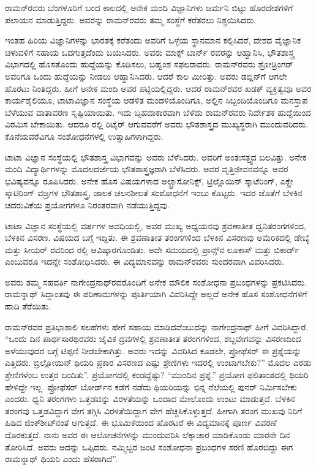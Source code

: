 ರಾಮನ್‍ರವರು ಬೆಂಗಳೂರಿಗೆ ಬಂದ ಕಾಲದಲ್ಲಿ ಅನೇಕ ಮಂದಿ ವಿಜ್ಞಾನಿಗಳು ಜರ್ಮನಿ ಬಿಟ್ಟು ಹೊರದೇಶಗಳಿಗೆ ಪಲಾಯನ ಮಾಡುತ್ತಿದ್ದರು. ಅವರನ್ನು ರಾಮನ್‍ರವರು ತಮ್ಮ ಸಂಸ್ಥೆಗೆ ಕರೆತರಲು ನಿಶ್ಚಯಿಸಿದರು.

ಇಂತಹ ಹಿರಿಯ ವಿಜ್ಞಾನಿಗಳನ್ನು ಭಾರತಕ್ಕೆ ಕರೆತಂದು ಅವರಿಗೆ ಒಳ್ಳೆಯ ಸ್ಥಾನಮಾನ ಕಲ್ಪಿಸಿದರೆ, ದೇಶದ ವೈಜ್ಞಾನಿಕ ಚಳುವಳಿಗೆ ಸಹಾಯ ಒದಗುತ್ತದೆಂದು ಬಯಸಿದರು. ಅವರು ಮಾಕ್ಸ್ ಬಾರ್ನ್ ರವರನ್ನು ಆಹ್ವಾನಿಸಿ, ಭೌತಶಾಸ್ತ್ರ ವಿಭಾಗದಲ್ಲಿ ಹೊಸತೊಂದು ಹುದ್ದೆಯನ್ನು ಕೊಡಿಸಲು, ಬಹ್ವಂಶ ಸಫಲರಾದರು. ರಾಮನ್‍ರವರು ಶ್ರೋಡ್ರಿಂಗರ್ ಅವರಿಗೂ ಒಂದು ಹುದ್ದೆಯನ್ನು ನೀಡಲು ಆಹ್ವಾನಿಸಿದರು. ಆದರೆ ಕಾಲ ಮೀರಿತ್ತು. ಅವರು ಡಬ್ಲಿನ್‍ಗೆ ಆಗಲೇ ಹೊರಟು ನಿಂತಿದ್ದರು. ಹೀಗೆ ಅನೇಕ ಮಂದಿ ಅವರ ಪಟ್ಟಿಯಲ್ಲಿದ್ದರು. ಆದರೆ ರಾಮನ್‍ರವರ ಖಡಕ್ ವ್ಯಕ್ತಿತ್ವವೂ ಅವರ ಕಾರ್ಯಶೈಲಿಯೂ, ಟಾಟಾವಿಜ್ಞಾನ ಸಂಸ್ಥೆಯ ಆಡಳಿತ ಮಂಡಳಿಯೊಂದಿಗೂ, ಅಲ್ಲಿನ ಸಿಬ್ಬಂದಿಯೊಂದಿಗೂ ಮನಸ್ತಾಪ ಬೆಳೆಯುವ ವಾತಾವರಣ ಸೃಷ್ಟಿಯಾಯಿತು. ಇದು ಬೃಹದಾಕಾರವಾಗಿ ಬೆಳೆದು ರಾಮನ್‍ರವರು ನಿರ್ದೇಶಕ ಹುದ್ದೆಯಿಂದ ವಿರಮಿಸ ಬೇಕಾಯಿತು. ಆದರೂ ರಲ್ಲಿ ರಿಟೈರ್ ಆಗುವವರೆಗೆ ಅವರು ಭೌತಶಾಸ್ತ್ರದ ಮುಖ್ಯಸ್ಥರಾಗಿ ಮುಂದುವರಿದರು. ಕೊನೆಯವರೆವಿಗೂ ಸಂಶೋಧನೆಗಳಲ್ಲಿ ಉತ್ಸಾಹಿಗಳಾಗಿದ್ದರು.

ಟಾಟಾ ವಿಜ್ಞಾನ ಸಂಸ್ಥೆಯಲ್ಲಿ ಭೌತಶಾಸ್ತ್ರ ವಿಭಾಗವನ್ನು ಅವರು ಬೆಳೆಸಿದರು. ಅವರಿಗೆ ಅಂತಃಸತ್ತ್ವದ ಬಲವಿತ್ತು. ಅನೇಕ ಮಂದಿ ವಿದ್ಯಾರ್ಥಿಗಳನ್ನು ಮೊದಲದರ್ಜೆಯ ಭೌತಶಾಸ್ತ್ರಜ್ಞರಾಗಿ ಬೆಳೆಸಿದರು. ಅವರ ವೃತ್ತಿಜೀವನವನ್ನೂ ಅವರ ಭವಿಷ್ಯವನ್ನೂ ರೂಪಿಸಿದರು. ಅನೇಕ ಹೊಸ ವಿಷಯಗಳಾದ ಅಲ್ಟ್ರಾಸೋನಿಕ್ಸ್, ಟ್ರಿಲ್ಲೊಯಿನ್ ಸ್ಕಾಟೆರಿಂಗ್, ಎಕ್ಸ್\enginline{-}ರೇ ಸ್ಕಾಟಿರಿಂಗ್ ವಜ್ರಗಳ ಭೌತಶಾಸ್ತ್ರ, ಜಾಲಕ ಚಲನಶೀಲತೆ ಸಂಶೋಧನೆಗೆ ಇಂಬು ಕೊಟ್ಟರು. ಇದರ ಜೊತೆಗೆ ಬೆಳಕಿನ ಚದರುವಿಕೆಯ ಪ್ರಯೋಗಗಳೂ ನಿರಂತರವಾಗಿ ನಡೆಯುತ್ತಿದ್ದವು.

ಟಾಟಾ ವಿಜ್ಞಾನ ಸಂಸ್ಥೆಯಲ್ಲಿ  ವರ್ಷಗಳ ಅವಧಿಯಲ್ಲಿ, ಅವರ ಮುಖ್ಯ ಅಧ್ಯಯನವು ಶ್ರವಣಾತೀತ ಧ್ವನಿತರಂಗಗಳಿಂದ, ಬೆಳಕಿನ ವಿಸರಣ. ವಿಷಯದ ಬಗ್ಗೆ ಇದ್ದಿತು. ಈ ಶ್ರವಣಾತೀತ ತರಂಗಗಳಿಂದ ಬೆಳಕಿನ ವಿಸರಣವು ಅಮೆರಿಕದಲ್ಲಿ ಡೇಬ್ಯೆ ಮತ್ತು ಸೀಯರ್ ರವರಿಂದ ರಲ್ಲಿ ಆವಿಷ್ಕಾರಗೊಂಡಿತು. ಅದೇ ಸಮಯದಲ್ಲಿ ಪ್ರಾನ್ಸ್‌ನ ಲೂಕಾಸ್ ಮತ್ತು ಬಿಕಾರ್ಡ್ ಎಂಬುವರೂ ಇದನ್ನೇ ಸಂಶೋಧಿಸಿದರು. ಈ ವಿದ್ಯಮಾನವನ್ನು ರಾಮನ್‍ರವರು ಸುಂದರವಾಗಿ ವಿವರಿಸಿದರು.

ಅವರು ತಮ್ಮ ಸಹವರ್ತಿ ನಾಗೇಂದ್ರನಾಥ್‍ರವರೊಂದಿಗೆ ಅನೇಕ ಮೌಲಿಕ ಸಂಶೋಧನಾ ಪ್ರಬಂಧಗಳನ್ನು ಪ್ರಕಟಿಸಿದರು. ರಾಮನ್\enginline{-}ನಾಥ್ ಸಿದ್ದಾಂತವು ಈ ಪರಿಣಾಮಗಳನ್ನು ಪೂರ್ತಿಯಾಗಿ ವಿವರಿಸಿದ್ದೇ ಅಲ್ಲದೆ ಅನೇಕ ಹೊಸ ಸಂಶೋಧನೆಗಳಿಗೆ ಹಾದಿ ತೆರೆಯಿತು.

ರಾಮನ್‍ರವರ ಪ್ರತಿಭಾಶಾಲಿ ಸಲಹೆಗಳು ಹೇಗೆ ಸಹಾಯ ಮಾಡಿದವೆಂಬುದನ್ನು ನಾಗೇಂದ್ರನಾಥ್ ಹೀಗೆ ವಿವರಿಸಿದ್ದಾರೆ. \enginline{-}“ಒಂದು ದಿನ ಪಾರ್ಥಸಾರಥಿರವರು ಜೈವಿಕ ದ್ರವಗಳಲ್ಲಿ ಶ್ರವಣಾತೀತ ತರಂಗಗಳಿಂದ, ಶಬ್ದವೇಗವನ್ನು ವಿಸರಣದಿಂದ ಅಳೆಯುವುದರ ಬಗ್ಗೆ ಟಿಪ್ಪಣಿ ನೀಡಬೇಕಾಗಿತ್ತು. ಅವರು ಇದನ್ನು ವಿವರಿಸಿದ ಕೂಡಲೇ, ಪ್ರೋಫೆಸರ್ ಈ ಪ್ರಶ್ನೆಯನ್ನು ಎತ್ತಿದರು. ಬ್ರಿಲ್ಲೋಯಿನ್ ಥಿಯರಿ ಪ್ರಕಾರ ವಿಸರಣದ ಎಷ್ಟು ಶ್ರೇಣಿಗಳು ಇದರಲ್ಲಿ ಉಂಟಾಗಬೇಕು?” ಮೊದಲ ಎರಡು ಶ್ರೇಣಿಗಳೆಂಬ ಉತ್ತರ ಬಂದಿತು”. ಪ್ರಯೋಗದಲ್ಲಿ ಕಂಡದ್ದೆಷ್ಟು? “ಮುಂದಿನ ಪ್ರಶ್ನೆ.” ಪ್ರಯೋಗ ಫಲಿತಾಂಶದಲ್ಲಿ ಥಿಯರಿ ಹೇಳಿದ್ದೇ ಇಲ್ಲ. ಪ್ರೋಫೆಸರ್ ಬೋರ್ಡ್‌ನ ಕಡೆಗೆ ನಡೆದು ಥಿಯರಿಯನ್ನು ಭಿನ್ನ ನೆಲೆಯಲ್ಲಿ ಪುನರ್ ನಿರ್ಮಿಸಬೇಕು ಎಂದರು. ಧ್ವನಿ ತರಂಗಗಳು ಒತ್ತಡವನ್ನು ವಿರಳತೆಯನ್ನು ಒಂದಾದ ಮೇಲೊಂದು ಉಂಟು ಮಾಡುತ್ತವೆ. ಬೆಳಕಿನ ತರಂಗವು ಒತ್ತಡವಿದ್ದಾಗ ವೇಗ ತಗ್ಗಿಸಿ ವಿರಳತೆಯಿದ್ದಾಗ ವೇಗ ಹೆಚ್ಚಿಸಿಕೊಳ್ಳುತ್ತದೆ. ಹೀಗಾಗಿ ತರಂಗ ಮುಖವು ನಿರಿಗೆ ಹಿಡಿದ ಜಿಂಕ್‍ಶೀಟ್‍ನಂತೆ ಆಗುತ್ತದೆ. ಈ ಭೂಮಿಕೆಯಿಂದ ಹೊರಟರೆ ಈ ವಿದ್ಯಮಾನಕ್ಕೆ ಪೂರ್ಣ ವಿವರಣೆ ದೊರಕುತ್ತದೆ. ನಾನು ಅವರ ಈ ಆಲೋಚನೆಗಳನ್ನು ಮುಂದುವರಿಸಿ ಲೆಕ್ಕಾಚಾರ ಮಾಡಿಕೊಂಡು ಮಾರನೇ ದಿನ ತೋರಿಸಿದೆ. ಅವರು ಅದನ್ನು ಒಪ್ಪಿದರು. ನಮ್ಮಿಬ್ಬರ ಜಂಟಿ ಸಂಶೋಧನಾ ಪ್ರಬಂಧಗಳ ಸರಣಿ ಹೊರಬಿದ್ದು ಈಗ ರಾಮನ್\enginline{-}ನಾಥ್ ಥಿಯರಿ ಎಂದು ಹೆಸರಾಗಿದೆ”.

